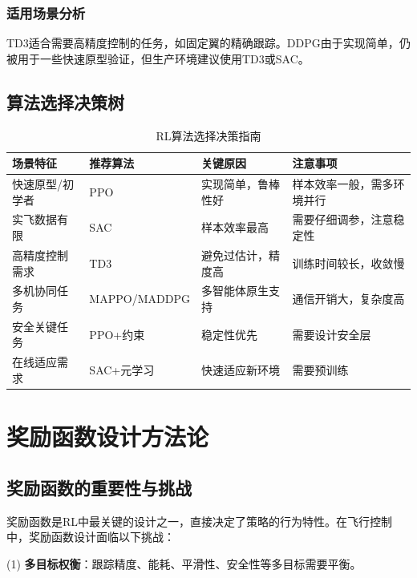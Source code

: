 \documentclass[12pt,a4paper]{ctexart}
\begin{document}
\subsubsection{适用场景分析}

TD3适合需要高精度控制的任务，如固定翼的精确跟踪。DDPG由于实现简单，仍被用于一些快速原型验证，但生产环境建议使用TD3或SAC。

\subsection{算法选择决策树}

\begin{table}[htbp]
\centering
\caption{RL算法选择决策指南}\label{tab:algorithm_guide}
\begin{tabular}{@{}llll@{}}
\toprule
\textbf{场景特征} & \textbf{推荐算法} & \textbf{关键原因} & \textbf{注意事项} \\
\midrule
快速原型/初学者 & PPO & 实现简单，鲁棒性好 & 样本效率一般，需多环境并行 \\
实飞数据有限 & SAC & 样本效率最高 & 需要仔细调参，注意稳定性 \\
高精度控制需求 & TD3 & 避免过估计，精度高 & 训练时间较长，收敛慢 \\
多机协同任务 & MAPPO/MADDPG & 多智能体原生支持 & 通信开销大，复杂度高 \\
安全关键任务 & PPO+约束 & 稳定性优先 & 需要设计安全层 \\
在线适应需求 & SAC+元学习 & 快速适应新环境 & 需要预训练 \\
\bottomrule
\end{tabular}
\end{table}

\section{奖励函数设计方法论}\label{sec:reward_design}

\subsection{奖励函数的重要性与挑战}

奖励函数是RL中最关键的设计之一，直接决定了策略的行为特性。在飞行控制中，奖励函数设计面临以下挑战：

(1) \textbf{多目标权衡}：跟踪精度、能耗、平滑性、安全性等多目标需要平衡。
\end{document}
